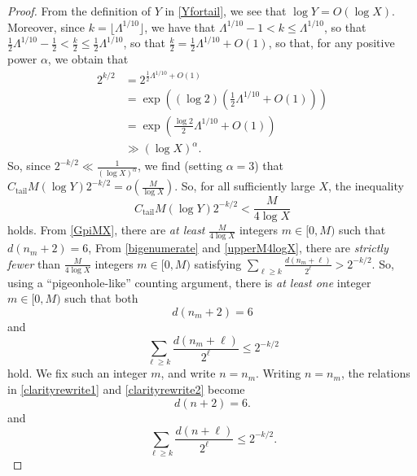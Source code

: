 \documentclass[12pt]{article}
\begin{document}
\begin{proof}
 From the definition of $Y$ in \eqref{Yfortail}, we see that $ \log Y = O(\log X)$. Moreover, since $k = \lfloor \Lambda^{1/10} \rfloor$, 
 we have that $\Lambda^{1/10} - 1 < k \leq \Lambda^{1/10}$, so that $\frac{1}{2} \Lambda^{1/10} - \frac{1}{2} < \frac{k}{2} \leq 
 \frac{1}{2} \Lambda^{1/10}$, so that $ \frac{k}{2} = \frac{1}{2} \Lambda^{1/10} + O(1)$, so that, for any positive power $\alpha$, 
 we obtain  that 
\begin{align*}
 2^{k/2} & = 2^{\frac{1}{2} \Lambda^{1/10} + O(1)} \\ 
 & = \exp\left( \left( \log 2 \right) \left( \frac{1}{2} \Lambda^{1/10} + O(1) \right) \right) \\ 
 & = \exp\left( \frac{\log 2}{2} \Lambda^{1/10} + O(1) \right) \\ 
 & \gg \left( \log X \right)^{\alpha}. 
\end{align*}
 So, since $2^{-k/2} \ll \frac{1}{(\log X)^{\alpha}}$, we find (setting $\alpha =3$) that $ C_{\operatorname{tail}} M (\log Y) 2^{-k/2} = 
 o\left( \frac{M}{\log X} \right)$. So, for all sufficiently large $X$, the inequality 
\begin{equation}\label{upperM4logX} 
 C_{\operatorname{tail}} M (\log Y) 2^{-k/2} < \frac{M}{4 \log X} 
\end{equation}
 holds. From \eqref{GpiMX}, 
 there are \emph{at least} $\frac{M}{4 \log X}$ integers $m \in [0, M)$
 such that $d(n_m + 2) = 6$, 
 From \eqref{bigenumerate} and \eqref{upperM4logX}, 
 there are \emph{strictly fewer} than $\frac{M}{4 \log X}$ integers $m \in [0, M)$ 
 satisfying 
 $ \sum_{\ell \geq k} \frac{d(n_m + \ell)}{2^\ell} > 2^{-k/2}$. 
 So, using a ``pigeonhole-like'' counting argument, there is \emph{at least one} integer $m \in [0, M)$ such that both 
\begin{equation}\label{clarityrewrite1}
 d(n_m + 2) = 6 
\end{equation}
 and 
\begin{equation}\label{clarityrewrite2} 
 \sum_{\ell \geq k} \frac{d(n_m + \ell)}{2^\ell} \leq 2^{-k/2} 
\end{equation}
 hold. We fix such an integer $m$, and write $n = n_m$. Writing $n = n_m$, the relations in \eqref{clarityrewrite1} and 
 \eqref{clarityrewrite2} become 
\begin{equation}\label{dnplus2} 
 d(n + 2) = 6. 
\end{equation}
 and 
\begin{equation}\label{simplifytail} 
 \sum_{\ell \geq k} \frac{d(n + \ell)}{2^{\ell}} \leq 2^{-k/2}. 
\end{equation}


\end{proof}
\end{document}
